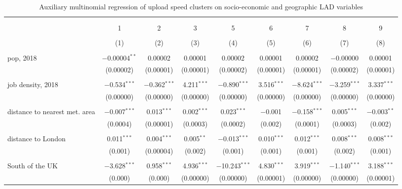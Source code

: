 \documentclass[]{interact}
\theoremstyle{plain}%
\theoremstyle{definition}
\theoremstyle{remark}
\begin{document}
\begin{table} \centering 
  \caption{Auxiliary multinomial regression of upload speed clusters on socio-economic and geographic LAD variables\label{aux}} 
  \label{} 
\tiny 
\begin{tabular}{@{\extracolsep{5pt}}lcccccccc} 
\\[-1.8ex]\hline 
\hline \\[-1.8ex] 
\\[-1.8ex] & 1 & 2 & 3 & 5 & 6 & 7 & 8 & 9 \\ 
\\[-1.8ex] & (1) & (2) & (3) & (4) & (5) & (6) & (7) & (8)\\ 
\hline \\[-1.8ex] 
 pop, 2018 & $-$0.00004$^{**}$ & 0.00002 & 0.00001 & 0.00002 & 0.00001 & 0.00002 & $-$0.00000 & 0.00001 \\ 
  & (0.00002) & (0.00001) & (0.00001) & (0.00002) & (0.00001) & (0.00001) & (0.00002) & (0.00001) \\ 
  & & & & & & & & \\ 
 job density, 2018 & $-$0.534$^{***}$ & $-$0.362$^{***}$ & 4.211$^{***}$ & $-$0.890$^{***}$ & 3.516$^{***}$ & $-$8.624$^{***}$ & $-$3.259$^{***}$ & 3.337$^{***}$ \\ 
  & (0.00000) & (0.00000) & (0.00000) & (0.00000) & (0.00000) & (0.00000) & (0.00000) & (0.00000) \\ 
  & & & & & & & & \\ 
 distance to nearest met. area & $-$0.007$^{***}$ & 0.013$^{***}$ & 0.002$^{***}$ & 0.023$^{***}$ & $-$0.001 & $-$0.158$^{***}$ & 0.005$^{***}$ & $-$0.003$^{**}$ \\ 
  & (0.0004) & (0.00001) & (0.0003) & (0.0002) & (0.002) & (0.0001) & (0.0003) & (0.002) \\ 
  & & & & & & & & \\ 
 distance to London & 0.011$^{***}$ & 0.004$^{***}$ & 0.005$^{**}$ & $-$0.013$^{***}$ & 0.010$^{***}$ & 0.012$^{***}$ & 0.008$^{***}$ & 0.008$^{***}$ \\ 
  & (0.001) & (0.00004) & (0.002) & (0.001) & (0.001) & (0.001) & (0.002) & (0.001) \\ 
  & & & & & & & & \\ 
 South of the UK & $-$3.628$^{***}$ & 0.958$^{***}$ & 4.936$^{***}$ & $-$10.243$^{***}$ & 4.830$^{***}$ & 3.919$^{***}$ & $-$1.140$^{***}$ & 3.188$^{***}$ \\ 
  & (0.000) & (0.000) & (0.00000) & (0.00000) & (0.00001) & (0.00000) & (0.00000) & (0.00001) \\ 

\end{tabular}
\end{table}
\end{document}
